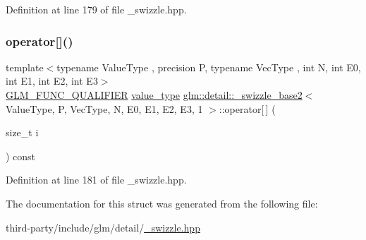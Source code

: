 Definition at line 179 of file \+\_\+swizzle.\+hpp.

\mbox{\label{structglm_1_1detail_1_1__swizzle__base2_3_01_value_type_00_01_p_00_01_vec_type_00_01_n_00_01_e0_fc19218d69dc8988a4a57fbe7f79725c_a6b72ddaed2713911d1cb17ebe14d481a}} 
\subsubsection{\texorpdfstring{operator[]()}{operator[]()}}
{\footnotesize\ttfamily template$<$typename Value\+Type , precision P, typename Vec\+Type , int N, int E0, int E1, int E2, int E3$>$ \\
\hyperlink{setup_8hpp_a33fdea6f91c5f834105f7415e2a64407}{G\+L\+M\+\_\+\+F\+U\+N\+C\+\_\+\+Q\+U\+A\+L\+I\+F\+I\+ER} \hyperlink{structglm_1_1detail_1_1__swizzle__base2_3_01_value_type_00_01_p_00_01_vec_type_00_01_n_00_01_e0_fc19218d69dc8988a4a57fbe7f79725c_aea7ec681454787ad7a322c06aec98757}{value\+\_\+type} \hyperlink{structglm_1_1detail_1_1__swizzle__base2}{glm\+::detail\+::\+\_\+swizzle\+\_\+base2}$<$ Value\+Type, P, Vec\+Type, N, E0, E1, E2, E3, 1 $>$\+::operator\mbox{[}$\,$\mbox{]} (\begin{DoxyParamCaption}\item[{size\+\_\+t}]{i }\end{DoxyParamCaption}) const\hspace{0.3cm}{\ttfamily [inline]}}



Definition at line 181 of file \+\_\+swizzle.\+hpp.



The documentation for this struct was generated from the following file\+:\begin{DoxyCompactItemize}
\item 
third-\/party/include/glm/detail/\hyperlink{__swizzle_8hpp}{\+\_\+swizzle.\+hpp}\end{DoxyCompactItemize}
